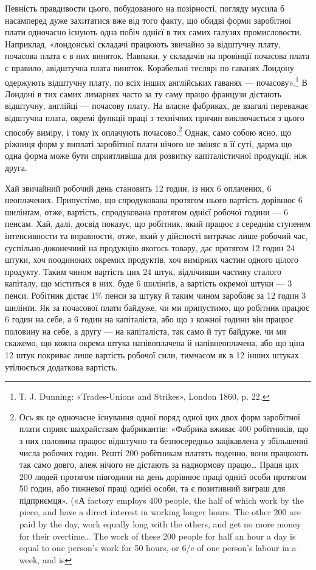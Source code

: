 Певність правдивости цього, побудованого на позірності, погляду
мусила б насамперед дуже захитатися вже від того факту,
що обидві форми заробітної плати одночасно існують одна побіч
однієї в тих самих галузях промисловости. Наприклад, «лондонські
складачі працюють звичайно за відштучну плату, почасова
плата є в них виняток. Навпаки, у складачів на провінції
почасова плата є правило, авідштучна плата виняток. Корабельні
теслярі по гаванях Лондону одержують відштучну плату, по
всіх інших англійських гаванях — почасову».\footnote{
Т. J. Dunning: «Trades-Unions and Strikes», London 1860,
p. 22.
} В Лондоні в
тих самих лимарнях часто за ту саму працю французи дістають
відштучну, англійці — почасову плату. На власне фабриках,
де взагалі переважає відштучна плата, окремі функції праці з
технічних причин виключається з цього способу виміру, і тому
їх оплачують почасово.\footnote{
Ось як це одночасне існування одної поряд одної цих двох форм
заробітної плати сприяє шахрайствам фабрикантів: «Фабрика вживає
400 робітників, що з них половина працює відштучно та безпосередньо
зацікавлена у збільшенні числа робочих годин. Решті 200 робітникам
платять поденно, вони працюють так само довго, алеж нічого не дістають
за наднормову працю\dots{} Праця цих 200 людей протягом півгодини
на день дорівнює праці однієї особи протягом 50 годин, або  тижневої
праці однієї особи, та є позитивний виграш для підприємця». («А factory
employs 400 people, the half of which work by the piece, and have a direct
interest in working longer hours. The other 200 are paid by the day,
work equally long with the others, and get no more money for their overtime\dots{}
The work of these 200 people for half an hour a day is equal to one
person’s work for 50 hours, or 6/e of one person’s labour in a week, and is
} Однак, само собою ясно, що ріжниця
форм у виплаті заробітної плати нічого не зміняє в її суті, дарма
що одна форма може бути сприятливіша для розвитку капіталістичної
продукції, ніж друга.

Хай звичайний робочий день становить 12 годин, із них 6
оплачених, 6 неоплачених. Припустімо, що спродукована протягом
нього вартість дорівнює 6 шилінґам, отже, вартість, спродукована
протягом однієї робочої години — 6 пенсам. Хай,
далі, досвід показує, що робітник, який працює з середнім
ступенем інтенсивности та вправности, отже, який у дійсності
витрачає лише робочий час, суспільно-доконечний на продукцію
якогось товару, дає протягом 12 годин 24 штуки, хоч поодиноких
окремих продуктів, хоч вимірних частин одного цілого продукту.
Таким чином вартість цих 24 штук, відлічивши частину
сталого капіталу, що міститься в них, буде 6 шилінґів, а вартість
окремої штуки — 3 пенси. Робітник дістає 1\% пенси за
штуку й таким чином заробляє за 12 годин 3 шилінґи. Як за
почасової плати байдуже, чи ми припустимо, що робітник працює
6 годин на себе, а 6 годин на капіталіста, або що з кожної години
він працює половину на себе, а другу — на капіталіста, так само
й тут байдуже, чи ми скажемо, що кожна окрема штука напівоплачена
й напівнеоплачена, або що ціна 12 штук покриває лише
вартість робочої сили, тимчасом як в 12 інших штуках утілюється
додаткова вартість.

